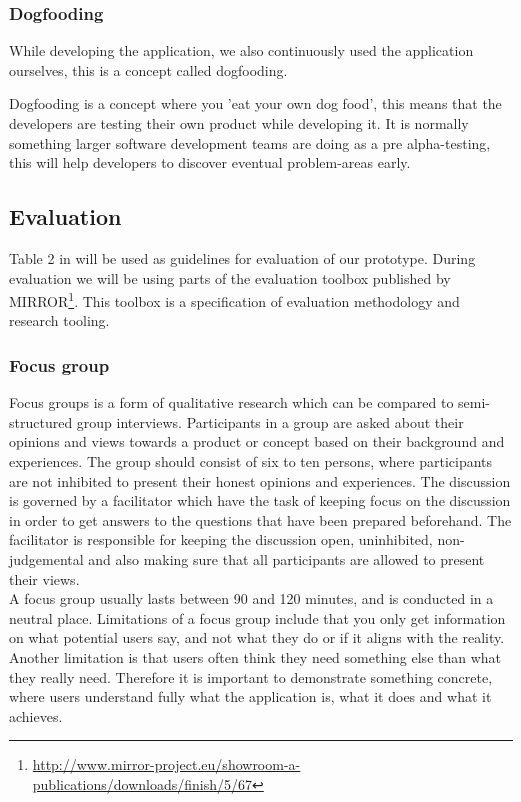 \subsubsection*{Dogfooding}
While developing the application, we also continuously used the application ourselves, this is a concept called dogfooding.

Dogfooding is a concept where you 'eat your own dog food', this means that the developers are testing their own product while developing it\citep{dogfooding}. It is normally something larger software development teams are doing as a pre alpha-testing, this will help developers to discover eventual problem-areas early.

\subsection{Evaluation}
Table 2 in \citep{Esearch2004} will be used as guidelines for evaluation of our prototype. 
During evaluation we will be using parts of the evaluation toolbox published by MIRROR\footnote{\url{http://www.mirror-project.eu/showroom-a-publications/downloads/finish/5/67}}. This toolbox is a specification of evaluation methodology and research tooling. 

\subsubsection{Focus group}
Focus groups is a form of qualitative research which can be compared to semi-structured group interviews\citep{rogers2011interaction}. Participants in a group are asked about their opinions and views towards a product or concept based on their background and experiences\citep{krueger2008focus}. The group should consist of six to ten persons, where participants are not inhibited to present their honest opinions and experiences\citep{krueger2008focus}. The discussion is governed by a facilitator which have the task of keeping focus on the discussion in order to get answers to the questions that have been prepared beforehand\citep{krueger2008focus, nielsen1997use}. The facilitator is responsible for keeping the discussion open, uninhibited, non-judgemental and also making sure that all participants are allowed to present their views\citep{powell1996focus}. \\
A focus group usually lasts between 90 and 120 minutes, and is conducted in a neutral place. Limitations of a focus group include that you only get information on what potential users say, and not what they do or if it aligns with the reality\citep{nielsen1997use}. Another limitation is that users often think they need something else than what they really need. Therefore it is important to demonstrate something concrete, where users understand fully what the application is, what it does and what it achieves. 
 
